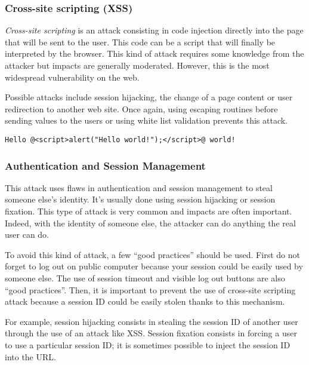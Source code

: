\subsubsection{Cross-site scripting (XSS)}

\emph{Cross-site scripting} is an attack consisting in code injection directly
into the page that will be sent to the user.
This code can be a script that will finally be interpreted by the browser.
This kind of attack requires some knowledge from the attacker but impacts are
generally moderated.
However, this is the most widespread vulnerability on the web.


Possible attacks include session hijacking, the change of a page content or
user redirection to another web site. Once again, using escaping routines
before sending values to the users or using white list validation prevents
this attack.

\begin{lstlisting}[style=beamer,
	caption={XSS test},
	label=lst:xss-input]
Hello @<script>alert("Hello world!");</script>@ world!
\end{lstlisting}

\subsubsection{Authentication and Session Management}

This attack uses flaws in authentication and session management to
steal someone else's identity. It's usually done using
session hijacking or session fixation. This type of attack is very
common and impacts are often important. Indeed, with the identity of someone
else, the attacker can do anything the real user can do.

To avoid this kind of attack, a few ``good practices'' should be used. First do not
forget to log out on public computer because your session could be easily used
by someone else. The use of session timeout and visible
log out buttons are also ``good practices''. Then, it is important to prevent
the use of cross-site scripting
attack because a session ID could be easily stolen thanks to this mechanism.

For example, session hijacking consists in stealing the session ID of another
user through the use of an attack like XSS. Session fixation consists in
forcing a user to use a particular session ID; it is sometimes possible to
inject the session ID into the URL.

